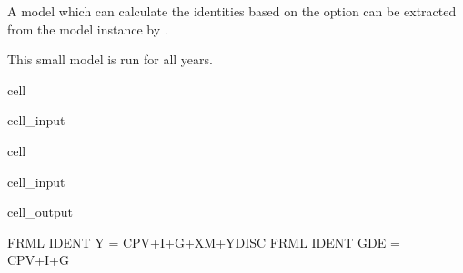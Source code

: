 \documentclass[letterpaper,10pt,english]{jupyterBook}
\begin{document}
\sphinxAtStartPar
A model which can calculate the identities based on the option can be extracted from the model instance by .

\sphinxAtStartPar
This small model is run for all years.

\begin{sphinxuseclass}{cell}\begin{sphinxVerbatimInput}

\begin{sphinxuseclass}{cell_input}
\begin{sphinxVerbatim}[commandchars=\\\{\}]
  
\end{sphinxVerbatim}

\end{sphinxuseclass}\end{sphinxVerbatimInput}

\end{sphinxuseclass}
\begin{sphinxuseclass}{cell}\begin{sphinxVerbatimInput}

\begin{sphinxuseclass}{cell_input}
\begin{sphinxVerbatim}[commandchars=\\\{\}]
 
\end{sphinxVerbatim}

\end{sphinxuseclass}\end{sphinxVerbatimInput}
\begin{sphinxVerbatimOutput}

\begin{sphinxuseclass}{cell_output}
\begin{sphinxVerbatim}[commandchars=\\\{\}]
FRML \PYGZlt{}IDENT\PYGZgt{} Y = CPV+I+G+X\PYGZhy{}M+YDISC\PYGZdl{}
FRML \PYGZlt{}IDENT\PYGZgt{} GDE = CPV+I+G\PYGZdl{}
\end{sphinxVerbatim}

\end{sphinxuseclass}\end{sphinxVerbatimOutput}

\end{sphinxuseclass}
\end{document}
